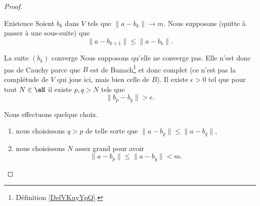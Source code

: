 \begin{proof}
\begin{subproof}
        \item[Existence]
            Soient \( b_k\) dans \( V\) tels que \( \| a-b_k \|\to m\). Nous supposons (quitte à passer à une sous-suite) que
            \begin{equation}
                \| a-b_{k+1} \|\leq \| a-b_k \|.
            \end{equation}
            \begin{subproof}
                \item[La suite \( (b_k)\) converge]
                    Nous supposons qu'elle ne converge pas. Elle n'est donc pas de Cauchy parce que \( B\) est de Banach\footnote{Définition \ref{DefVKuyYpQ}.} et donc complet (ce n'est pas la complétude de \( V\) qui joue ici, mais bien celle de \( B\)). Il existe \( \epsilon>0\) tel que pour tout \( N\in \eN\) il existe \( p,q>N\) tels que 
                    \begin{equation}
                        \| b_p-b_q \|>\epsilon.
                    \end{equation}

                    Nous effectuons quelque choix.
                    \begin{enumerate}
                        \item
                            nous choisissons \( q>p\) de telle sorte que $\| a-b_p \|\leq\| a-b_q \|$,
                        \item
                            nous choisissons \( N\) assez grand pour avoir
                            \begin{equation}
                                \| a-b_p \|\leq \| a-b_q \|<m.
                            \end{equation}
                    \end{enumerate}


\end{subproof}
\end{subproof}
\end{proof}
